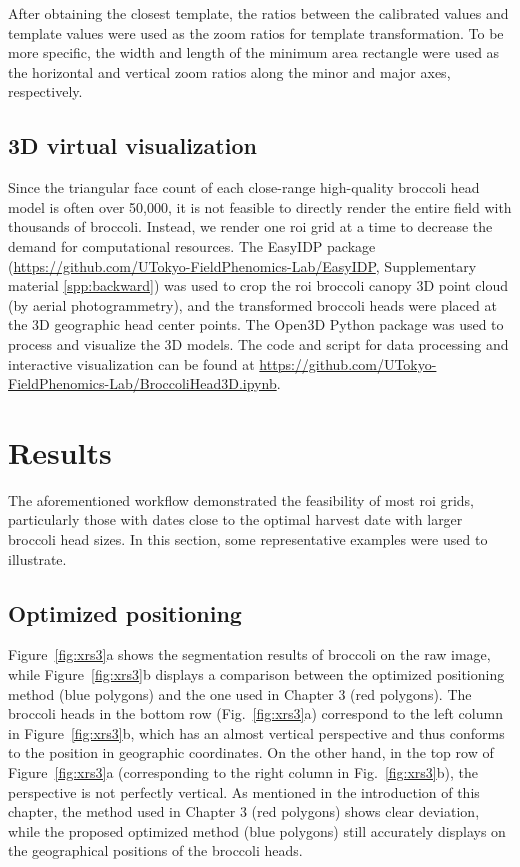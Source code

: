 After obtaining the closest template, the ratios between the calibrated values and template values were used as the zoom ratios for template transformation. To be more specific, the width and length of the minimum area rectangle were used as the horizontal and vertical zoom ratios along the minor and major axes, respectively.

\subsection{3D virtual visualization}

Since the triangular face count of each close-range high-quality broccoli head model is often over 50,000, it is not feasible to directly render the entire field with thousands of broccoli. Instead, we render one \gls{roi} grid at a time to decrease the demand for computational resources. The EasyIDP package (\url{https://github.com/UTokyo-FieldPhenomics-Lab/EasyIDP}, Supplementary material \ref{spp:backward}) was used to crop the \gls{roi} broccoli canopy 3D point cloud (by aerial photogrammetry), and the transformed broccoli heads were placed at the 3D geographic head center points. The Open3D Python package \citep[\url{https://github.com/isl-org/Open3D}]{zhou_open3d_2018} was used to process and visualize the 3D models. The code and script for data processing and interactive visualization can be found at \url{https://github.com/UTokyo-FieldPhenomics-Lab/BroccoliHead3D.ipynb}.

\section{Results}

The aforementioned workflow demonstrated the feasibility of most \gls{roi} grids, particularly those with dates close to the optimal harvest date with larger broccoli head sizes. In this section, some representative examples were used to illustrate.

\subsection{Optimized positioning}

Figure~\ref{fig:xrs3}a shows the segmentation results of broccoli on the raw image, while Figure~\ref{fig:xrs3}b displays a comparison between the optimized positioning method (blue polygons) and the one used in Chapter 3 (red polygons). The broccoli heads in the bottom row (Fig.~\ref{fig:xrs3}a) correspond to the left column in Figure~\ref{fig:xrs3}b, which has an almost vertical perspective and thus conforms to the position in geographic coordinates. On the other hand, in the top row of Figure~\ref{fig:xrs3}a (corresponding to the right column in Fig.~\ref{fig:xrs3}b), the perspective is not perfectly vertical. As mentioned in the introduction of this chapter, the method used in Chapter 3 (red polygons) shows clear deviation, while the proposed optimized method (blue polygons) still accurately displays on the geographical positions of the broccoli heads.


